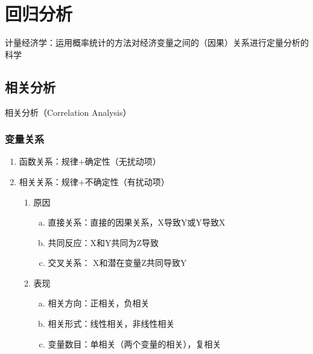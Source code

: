 \documentclass[12pt]{book}
\begin{document}
\chapter{回归分析}

计量经济学：运用概率统计的方法对经济变量之间的（因果）关系进行定量分析的科学

\section{相关分析}



相关分析（Correlation Analysis）


\subsection{变量关系}

\begin{enumerate}[1.]
    \item 函数关系：规律+确定性（无扰动项）  
    \item 相关关系：规律+不确定性（有扰动项）  
    \begin{enumerate}[(1)]
        \item 原因  
        \begin{enumerate}[a.]
            \item 直接关系：直接的因果关系，X导致Y或Y导致X  
            \item 共同反应：X和Y共同为Z导致  
            \item 交叉关系： X和潜在变量Z共同导致Y  
        \end{enumerate}
        \item 表现  
        \begin{enumerate}[a.]
            \item 相关方向：正相关，负相关   
            \item 相关形式：线性相关，非线性相关  
            \item 变量数目：单相关（两个变量的相关），复相关  
        \end{enumerate}
    \end{enumerate}
\end{enumerate}
\end{document}
